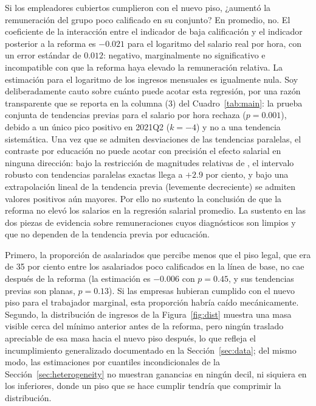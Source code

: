 Si los empleadores cubiertos cumplieron con el nuevo piso, ¿aumentó la remuneración del grupo poco calificado en su conjunto? En promedio, no. El coeficiente de la interacción entre el indicador de baja calificación y el indicador posterior a la reforma es $-0.021$ para el logaritmo del salario real por hora, con un error estándar de $0.012$: negativo, marginalmente no significativo e incompatible con que la reforma haya elevado la remuneración relativa. La estimación para el logaritmo de los ingresos mensuales es igualmente nula. Soy deliberadamente cauto sobre cuánto puede acotar esta regresión, por una razón transparente que se reporta en la columna (3) del Cuadro~\ref{tab:main}: la prueba conjunta de tendencias previas para el salario por hora rechaza ($p=0.001$), debido a un único pico positivo en 2021Q2 ($k=-4$) y no a una tendencia sistemática. Una vez que se admiten desviaciones de las tendencias paralelas, el contraste por educación no puede acotar con precisión el efecto salarial en ninguna dirección: bajo la restricción de magnitudes relativas de \citet{rambachan_roth_2023}, el intervalo robusto con tendencias paralelas exactas llega a $+2.9$ por ciento, y bajo una extrapolación lineal de la tendencia previa (levemente decreciente) se admiten valores positivos aún mayores. Por ello no sustento la conclusión de que la reforma no elevó los salarios en la regresión salarial promedio. La sustento en las dos piezas de evidencia sobre remuneraciones cuyos diagnósticos son limpios y que no dependen de la tendencia previa por educación.

Primero, la proporción de asalariados que percibe menos que el piso legal, que era de 35 por ciento entre los asalariados poco calificados en la línea de base, no cae después de la reforma (la estimación es $-0.006$ con $p=0.45$, y sus tendencias previas son planas, $p=0.13$). Si las empresas hubieran cumplido con el nuevo piso para el trabajador marginal, esta proporción habría caído mecánicamente. Segundo, la distribución de ingresos de la Figura~\ref{fig:dist} muestra una masa visible cerca del mínimo anterior antes de la reforma, pero ningún traslado apreciable de esa masa hacia el nuevo piso después, lo que refleja el incumplimiento generalizado documentado en la Sección~\ref{sec:data}; del mismo modo, las estimaciones por cuantiles incondicionales de la Sección~\ref{sec:heterogeneity} no muestran ganancias en ningún decil, ni siquiera en los inferiores, donde un piso que se hace cumplir tendría que comprimir la distribución.

